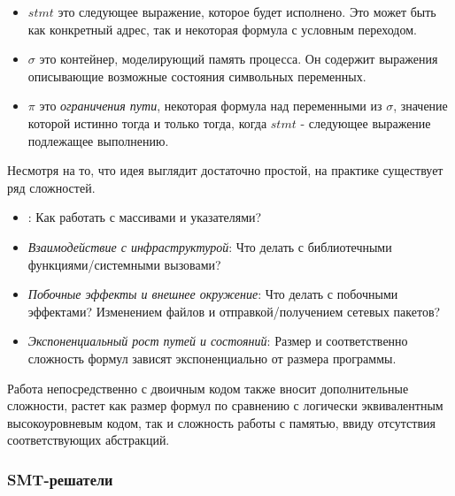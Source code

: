 \begin{itemize}
\item $stmt$ это следующее выражение, которое будет исполнено. Это может быть как конкретный адрес, так и некоторая формула с условным переходом.


\item $\sigma$ это контейнер, моделирующий память процесса. Он содержит выражения описывающие возможные состояния символьных переменных.

\item $\pi$ это {\em ограничения пути}, некоторая формула над переменными из $\sigma$, значение которой истинно тогда и только тогда, когда $stmt$ - следующее выражение подлежащее выполнению.

\end{itemize}

Несмотря на то, что идея выглядит достаточно простой, на практике существует ряд сложностей.

\begin{itemize}
\item {}: Как работать с массивами и указателями?

\item {\em Взаимодействие с инфраструктурой}: Что делать с библиотечными функциями/системными вызовами?

\item {\em Побочные эффекты и внешнее окружение}: Что делать с побочными эффектами? Изменением файлов и отправкой/получением сетевых пакетов?

\item {\em Экспоненциальный рост путей и состояний}: Размер и соответственно сложность формул зависят экспоненциально от размера программы.

\end{itemize}

Работа непосредственно с двоичным кодом также вносит дополнительные сложности, растет как размер формул по сравнению с логически эквивалентным высокоуровневым кодом, так и сложность работы с памятью, ввиду отсутствия соответствующих абстракций.

\bigskip

\subsubsection{SMT-решатели}

